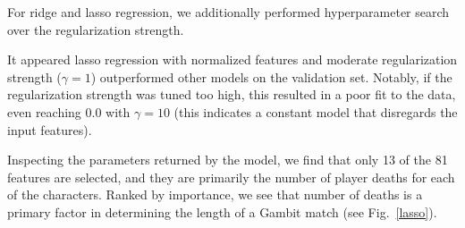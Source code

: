 \documentclass[conference]{IEEEtran}
\begin{document}
For ridge and lasso regression, we additionally performed hyperparameter search
over the regularization strength.

It appeared lasso regression with normalized features and moderate
regularization strength ($\gamma = 1$) outperformed other models on
the validation set. Notably, if the regularization strength was tuned too high,
this resulted in a poor fit to the data, even reaching 0.0 with
$\gamma = 10$ (this indicates a constant model that disregards the
input features).

Inspecting the parameters returned by the model, we find that only 13 of the 81
features are selected, and they are primarily the number of player deaths for
each of the characters. Ranked by importance, we see that number of deaths is a
primary factor in determining the length of a Gambit match (see
Fig.~\ref{lasso}).
\end{document}
